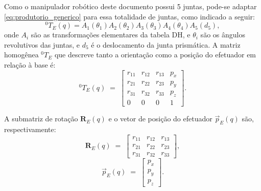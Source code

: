 Como o manipulador robótico deste documento possui 5 juntas, pode-se adaptar \eqref{eq:produtorio_generico} para essa totalidade de juntas, como indicado a seguir:
\begin{equation}
{}^{0}\!T_E(q)=
A_1(\theta_1)
A_2(\theta_2)
A_3(\theta_3)
A_4(\theta_4)
A_5(d_5),
\end{equation}
onde $A_i$ são as transformações elementares da tabela DH, e $\theta_i$ são os ângulos revolutivos das juntas, e $d_5$ é o deslocamento da junta prismática. A matriz homogênea ${}^0T_E$ que descreve tanto a orientação como a posição do efetuador em relação à base é:
\begin{equation}
{}^0T_E(q) \;=\;
\begin{bmatrix}
r_{11} & r_{12} & r_{13} & p_x \\
r_{21} & r_{22} & r_{23} & p_y \\
r_{31} & r_{32} & r_{33} & p_z \\
0      & 0      & 0      & 1
\end{bmatrix}.
\label{eq:T0E_completa}
\end{equation}

A submatriz de rotação $\mathbf{R}_E(q)$ e o vetor de posição do efetuador $\vec{p}_E(q)$ são, respectivamente:
\begin{equation}
\mathbf{R}_E(q) \;=\;
\begin{bmatrix}
r_{11} & r_{12} & r_{13} \\
r_{21} & r_{22} & r_{23} \\
r_{31} & r_{32} & r_{33}
\end{bmatrix},
\label{eq:RE_def}
\end{equation}
\begin{equation}
\vec{p}_E(q) \;=\;
\begin{bmatrix}
p_x \\ p_y \\ p_z
\end{bmatrix}.
\label{eq:pE_def}
\end{equation}






